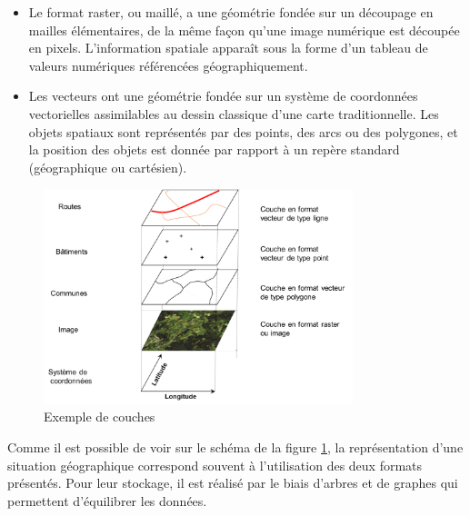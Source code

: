 \begin{itemize}[label=\textbullet]
    \item Le format raster, ou maillé, a une géométrie fondée sur un découpage en mailles élémentaires, de la même façon qu’une image numérique est découpée en pixels. L’information spatiale apparaît sous la forme d’un tableau de valeurs numériques référencées géographiquement.
    \item Les vecteurs ont une géométrie fondée sur un système de coordonnées vectorielles assimilables au dessin classique d’une carte traditionnelle. Les objets spatiaux sont représentés par des points, des arcs ou des polygones, et la position des objets est donnée par rapport à un repère standard (géographique ou cartésien).
\end{itemize}
\begin{figure}[htp]
  \centering
  \includegraphics[width=90mm]{./src_img/structure_donnees.png}
  \caption{Exemple de couches \supercite{uved}}
  \label{fig:struct}
\end{figure}
Comme il est possible de voir sur le schéma de la figure \ref{fig:struct}, la représentation d'une situation géographique correspond souvent à l'utilisation des deux formats présentés. Pour leur stockage, il est réalisé par le biais d'arbres et de graphes \supercite{arbresSIG} qui permettent d'équilibrer les données.



